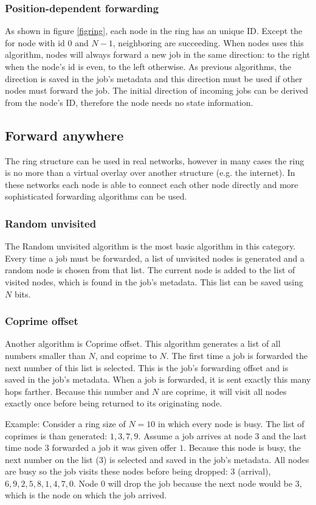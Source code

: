 \documentclass[10pt,a4paper]{article}
\begin{document}
\subsubsection*{Position-dependent forwarding}
As shown in figure \ref{figring}, each node in the ring has an unique ID. Except the for node with id $0$ and $N-1$, neighboring are succeeding. When nodes uses this algorithm, nodes will always forward a new job in the same direction: to the right when the node's id is even, to the left otherwise. As previous algorithms, the direction is saved in the job's metadata and this direction must be used if other nodes must forward the job. The initial direction of incoming jobs can be derived from the node's ID, therefore the node needs no state information.

\subsection{Forward anywhere}
The ring structure can be used in real networks, however in many cases the ring is no more than a virtual overlay over another structure (e.g. the internet). In these networks each node is able to connect each other node directly and more sophisticated forwarding algorithms can be used.

\subsubsection*{Random unvisited}
The Random unvisited algorithm is the most basic algorithm in this category. Every time a job must be forwarded, a list of unvisited nodes is generated and a random node is chosen from that list. The current node is added to the list of visited nodes, which is found in the job's metadata. This list can be saved using $N$ bits.

\subsubsection*{Coprime offset}
Another algorithm is Coprime offset. This algorithm generates a list of all numbers smaller than $N$, and coprime to $N$. The first time a job is forwarded the next number of this list is selected. This is the job's forwarding offset and is saved in the job's metadata. When a job is forwarded, it is sent exactly this many hops farther. Because this number and $N$ are coprime, it will visit all nodes exactly once before being returned to its originating node. 

Example:
Consider a ring size of $N=10$ in which every node is busy. The list of coprimes is than generated: ${1, 3, 7, 9}$. Assume a job arrives at node $3$ and the last time node $3$ forwarded a job it was given offer $1$.
Because this node is busy, the next number on the list ($3$) is selected and saved in the job's metadata. All nodes are busy so the job visits these nodes before being dropped: $3$ (arrival), $6, 9, 2, 5, 8, 1, 4, 7, 0$. Node $0$ will drop the job because the next node would be $3$, which is the node on which the job arrived.
\end{document}
